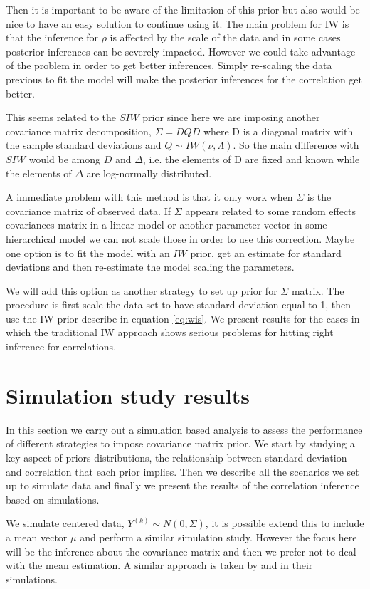 \documentclass{article}
\begin{document}
Then it is important to be aware of the limitation of this prior but also would be nice to have an easy solution to continue using it. The main problem for IW is that the inference for $\rho$ is affected by the scale of the data and in some cases posterior inferences can be severely impacted. However we could take advantage of the problem in order to get better inferences. Simply re-scaling the data previous to fit the model will make the posterior inferences for the correlation get better. 

This seems related to the $SIW$ prior since here we are imposing another covariance matrix decomposition, $\Sigma = DQD$ where D is a diagonal matrix with the sample standard deviations and $Q\sim IW(\nu, \Lambda)$. So the main difference with $SIW$ would be among $D$ and $\Delta$, i.e. the elements of D are fixed and known while the elements of $\Delta$ are log-normally distributed. 

A immediate problem with this method is that it only work when $\Sigma$ is the covariance matrix of observed data. If $\Sigma$ appears related to some random effects covariances matrix in a linear model or another parameter vector in some hierarchical model we can not scale those in order to use this correction.  Maybe one option is to fit the model with an $IW$ prior, get an estimate for standard deviations and then re-estimate the model scaling the parameters.

We will add this option as another strategy to set up prior for $\Sigma$ matrix. The procedure is first scale the data set to have standard deviation equal to 1, then use the IW prior describe in equation \ref{eq:wis}. We present results for the cases in which the traditional IW approach shows serious problems for hitting right inference for correlations. 

\section{Simulation study results}

In this section we carry out a simulation based analysis to assess the performance of different strategies to impose covariance matrix prior. We start by studying a key aspect of priors distributions, the relationship between standard deviation and correlation that each prior implies. Then we describe all the scenarios we set up to simulate data and finally we present the results of the correlation inference based on simulations.  

We simulate centered data, $Y^{(k)}\sim N(0,\Sigma)$, it is possible extend this to include a mean vector $\mu$ and perform a similar simulation study. However the focus here will be the inference about the covariance matrix and then we prefer not to deal with the mean estimation. A similar approach is taken by  \cite{daniels1999} and \cite{matilde} in their simulations.
\end{document}
